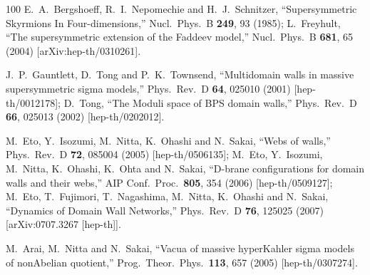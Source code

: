 \documentclass[aps,prd,preprint,
superscriptaddress]{revtex4}
\newcommand {\1}[1]{\frac{1}{#1}}
\newcommand {\2}[1]{\frac{i}{#1}}
\begin{document}
\begin{thebibliography}{100}
  E.~A.~Bergshoeff, R.~I.~Nepomechie and H.~J.~Schnitzer,
  ``Supersymmetric Skyrmions In Four-dimensions,''  Nucl.\ Phys.\ B {\bf 249}, 93 (1985);  %
  L.~Freyhult,
  ``The supersymmetric extension of the Faddeev model,''
  Nucl.\ Phys.\  B {\bf 681}, 65 (2004)
  [arXiv:hep-th/0310261].


  J.~P.~Gauntlett, D.~Tong and P.~K.~Townsend,
  ``Multidomain walls in massive supersymmetric sigma models,''  Phys.\ Rev.\ D {\bf 64}, 025010 (2001)  [hep-th/0012178];  %
  D.~Tong,
  ``The Moduli space of BPS domain walls,''  
Phys.\ Rev.\ D {\bf 66}, 025013 (2002)  [hep-th/0202012]. %

  M.~Eto, Y.~Isozumi, M.~Nitta, K.~Ohashi and N.~Sakai,
  ``Webs of walls,''  Phys.\ Rev.\ D {\bf 72}, 085004 (2005)  [hep-th/0506135];   %
  M.~Eto, Y.~Isozumi, M.~Nitta, K.~Ohashi, K.~Ohta and N.~Sakai,
  ``D-brane configurations for domain walls and their webs,''  AIP Conf.\ Proc.\  {\bf 805}, 354 (2006)  [hep-th/0509127];  %
  M.~Eto, T.~Fujimori, T.~Nagashima, M.~Nitta, K.~Ohashi and N.~Sakai,
  ``Dynamics of Domain Wall Networks,''  Phys.\ Rev.\ D {\bf 76}, 125025 (2007)  [arXiv:0707.3267 [hep-th]].  %

  M.~Arai, M.~Nitta and N.~Sakai,
  ``Vacua of massive hyperKahler sigma models of nonAbelian quotient,''  Prog.\ Theor.\ Phys.\  {\bf 113}, 657 (2005)  [hep-th/0307274].  %



\end{thebibliography}
\end{document}
